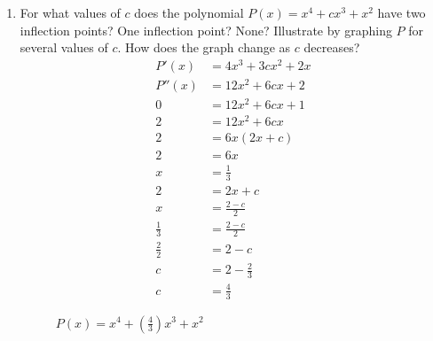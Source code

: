 \documentclass{article}
\begin{document}
\begin{enumerate}
	\pagebreak
\setcounter{enumi}{69}
	\item For what values of $c$ does the polynomial $P(x)=x^4+cx^3+x^2$ have two inflection points? One inflection point? None? Illustrate by graphing $P$ for several values of $c$. How does the graph change as $c$ decreases?
	$$\begin{align}
		P'(x)&=4x^3+3cx^2+2x\\
		P''(x)&=12x^2+6cx+2\\
		0&=12x^2+6cx+1\\
		2&=12x^2+6cx\\
		2&=6x(2x+c)\\
		2&=6x\\
		x&=\frac{1}{3}\\
		2&=2x+c\\
		x&=\frac{2-c}{2}\\
		\frac{1}{3}&=\frac{2-c}{2}\\
		\frac{2}{2}&=2-c\\
		c&=2-\frac{2}{3}\\
		c&=\frac{4}{3}
	\end{align}$$
	\begin{center}
		\begin{figure}[!htb]
	  		\pgfplotsset{width=\linewidth,height=\linewidth,xmin=-2,xmax=4}
		  \caption{$P(x)=x^4+(-3)x^3+x^2$}\label{fig:awesome_image1}
		\endminipage\hfill
	  		\pgfplotsset{width=\linewidth,height=\linewidth,xmin=-4,xmax=2}
		  \caption{$P(x)=x^4+(4)x^3+x^2$}\label{fig:awesome_image2}
		\endminipage\hfill
	  		\pgfplotsset{width=\linewidth,height=\linewidth,xmin=-3,xmax=2}
		  \caption{$P(x)=x^4+(\frac{4}{3})x^3+x^2$}\label{fig:awesome_image3}
		\endminipage
		\end{figure}

	\end{center}
\end{enumerate}
\end{document}
